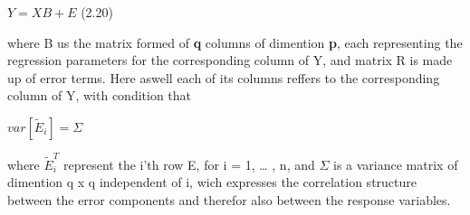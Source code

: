 \documentclass[]{article}
\begin{document}
\center \(Y = XB + E\) \center \hfill    (2.20)

where B us the matrix formed of \textbf{q} columns of dimention
\textbf{p}, each representing the regression parameters for the
corresponding column of Y, and matrix R is made up of error terms. Here
aswell each of its columns reffers to the corresponding column of Y,
with condition that

\center \(var[\tilde{E}_{i}] = \Sigma\) \center

where \(\tilde{E}_{i}^{T}\) represent the i'th row E, for i = 1,
\ldots{} , n, and \(\Sigma\) is a variance matrix of dimention q x q
independent of i, wich expresses the correlation structure between the
error components and therefor also between the response variables.
\end{document}
